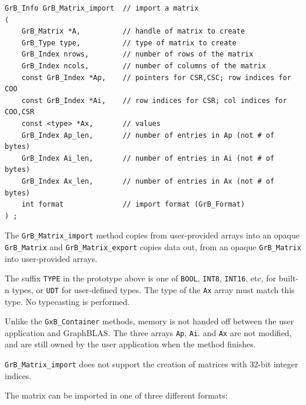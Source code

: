 \begin{mdframed}[userdefinedwidth=6in]
{\footnotesize
\begin{verbatim}
GrB_Info GrB_Matrix_import  // import a matrix
(
    GrB_Matrix *A,          // handle of matrix to create
    GrB_Type type,          // type of matrix to create
    GrB_Index nrows,        // number of rows of the matrix
    GrB_Index ncols,        // number of columns of the matrix
    const GrB_Index *Ap,    // pointers for CSR,CSC; row indices for COO
    const GrB_Index *Ai,    // row indices for CSR; col indices for COO,CSR
    const <type> *Ax,       // values
    GrB_Index Ap_len,       // number of entries in Ap (not # of bytes)
    GrB_Index Ai_len,       // number of entries in Ai (not # of bytes)
    GrB_Index Ax_len,       // number of entries in Ax (not # of bytes)
    int format              // import format (GrB_Format)
) ;
\end{verbatim}
} \end{mdframed}

The \verb'GrB_Matrix_import' method copies from user-provided arrays into an
opaque \verb'GrB_Matrix' and \verb'GrB_Matrix_export' copies data out, from an
opaque \verb'GrB_Matrix' into user-provided arrays.

The suffix \verb'TYPE' in the prototype above is one of \verb'BOOL',
\verb'INT8', \verb'INT16', etc, for built-n types, or \verb'UDT' for
user-defined types.  The type of the \verb'Ax' array must match this type.  No
typecasting is performed.

Unlike the \verb'GxB_Container' methods, memory is not handed off between the
user application and GraphBLAS.   The three arrays \verb'Ap', \verb'Ai'.  and
\verb'Ax' are not modified, and are still owned by the user application when
the method finishes.

\verb'GrB_Matrix_import' does not support the creation of matrices with 32-bit
integer indices.

The matrix can be imported in one of three different formats:

